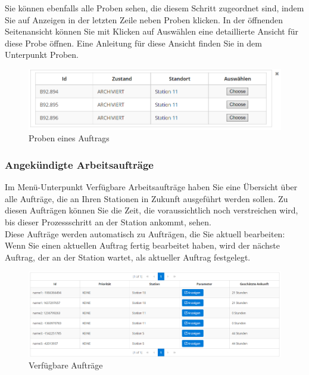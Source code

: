 \documentclass[enabledeprecatedfontcommands,fontsize=12pt,paper=a4,twoside]{scrartcl}
\begin{document}
Sie können ebenfalls alle Proben sehen, die diesem Schritt zugeordnet sind, indem Sie auf Anzeigen in der letzten Zeile neben Proben klicken. In der öffnenden Seitenansicht können Sie mit Klicken auf Auswählen eine detaillierte Ansicht für diese Probe öffnen. Eine Anleitung für diese Ansicht finden Sie in dem Unterpunkt Proben. \\

\begin{figure}[h!]
\begin{center}
 \includegraphics[width=\textwidth]{screenshots/t/auftragproben.png}
  \caption{Proben eines Auftrags}
  \label{fig:boat1}
\end{center}
\end{figure}

\subsubsection{Angekündigte Arbeitsaufträge}
Im Menü-Unterpunkt Verfügbare Arbeitsaufträge haben Sie eine Übersicht über alle Aufträge, die an Ihren Stationen in Zukunft ausgeführt werden sollen. Zu diesen Aufträgen können Sie die Zeit, die voraussichtlich noch verstreichen wird, bis dieser Prozessschritt an der Station ankommt, sehen. \\
 Diese Aufträge werden automatisch zu Aufträgen, die Sie aktuell bearbeiten: Wenn Sie einen aktuellen Auftrag fertig bearbeitet haben, wird der nächste Auftrag, der an der Station wartet, als aktueller Auftrag festgelegt. \\

\begin{figure}[h!]
\begin{center}
 \includegraphics[width=\textwidth]{screenshots/t/verfugbareauftrage.png}
  \caption{Verfügbare Aufträge}
  \label{fig:boat1}
\end{center}
\end{figure}
\end{document}
